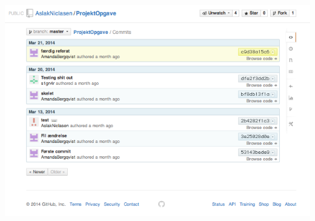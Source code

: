 \documentclass[a4paper,12pt]{article}
\begin{document}
\newpage
\includegraphics[width=\linewidth]{log5.png}
\end{document}
